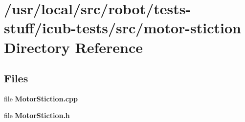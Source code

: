 \section{/usr/local/src/robot/tests-\/stuff/icub-\/tests/src/motor-\/stiction Directory Reference}
\label{dir_90eef672f96e9a8f6601ae4c3a253df9}
\subsection*{Files}
\begin{DoxyCompactItemize}
\item 
file {\bfseries Motor\-Stiction.\-cpp}
\item 
file {\bfseries Motor\-Stiction.\-h}
\end{DoxyCompactItemize}
